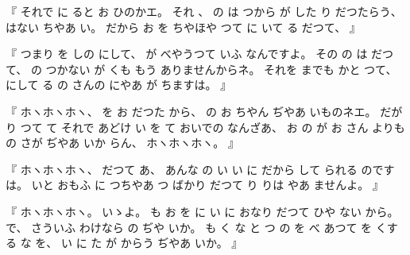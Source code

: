 %
『
それで
に
ると
お
ひのかエ。
%
それ
、
%
の
は
つから
が
した
り
だつたらう、
%
はない
ちやあ
い。
%
だから
お
を
ちやほや
つて
に
いて
る
だつて、
』

%
『
つまり
を
しの
にして、
%
が%
べやうつて
いふ
なんですよ。
%
その
の
は
だつて、
%
の
つかない
が
くも%
%
もう
ありませんからネ。
%
それを
までも
かと
つて、
%
にして
る
の
さんの
にやあ
が
ちますは。
』

%
『
ホヽホヽホヽ、
%
を
お
だつた
から、
%
の
お
ちやん
ぢやあ
いものネエ。
%
だが
り
つて
て
それで
あどけ
い
を
て
おいでの
なんざあ、
%
お
の
が
お
さん
よりも
の
さが
ぢやあ
いか
らん、
%
ホヽホヽホヽ。
』

%
『
ホヽホヽホヽ、
%
だつて
あ、
%
あんな
の
い
い
に
だから
して
られる
のですは。
%
いと
おもふ
に
つちやあ
つ
ばかり
だつて
り
りは
やあ
ませんよ。
』

%
『
ホヽホヽホヽ。
%
いゝよ。
%
も
お
を
に
い
に
おなり
だつて
ひや
ない
から。
%
で、
%
さういふ
わけなら
の
ぢや
いか。
%
も
く
な
と
つ
の
を
べ
あつて
を
くする
な
を、
%
い
に
た
が
からう
ぢやあ
いか。
』

